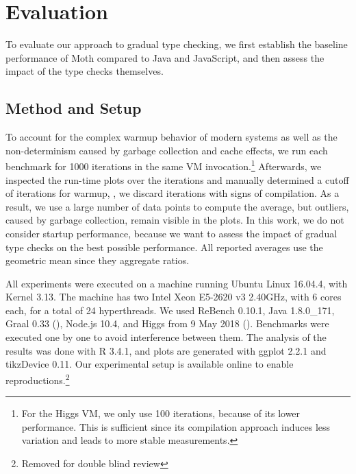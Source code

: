 
\section{Evaluation}
\label{sec:evaluation}

\newcommand{\NumIterationsAll}{1000\xspace}
\newcommand{\NumIterationsHiggs}{100\xspace}


To evaluate our approach to gradual type checking,
we first establish the baseline performance of Moth
compared to Java and JavaScript,
and then assess the impact of the type checks themselves.

\subsection{Method and Setup}

To account for the complex warmup behavior
of modern systems\citep{Barrett:2017:VMW} as well as
the non-determinism caused by \eg garbage collection and cache effects,
we run each benchmark for \NumIterationsAll iterations in the same
VM invocation.\footnote{
For the Higgs VM, we only use \NumIterationsHiggs iterations,
because of its lower performance.
This is sufficient since its compilation approach induces less variation
and leads to more stable measurements.}
Afterwards, we inspected the run-time plots over the iterations
and manually determined a cutoff of \WarmupCutOff iterations for warmup,
\ie, we discard iterations with signs of compilation.
As a result, we use a large number of data points to compute the average,
but outliers, caused by \eg garbage collection, remain visible in the plots.
In this work, we do not consider startup performance,
because we want to assess the impact of gradual type checks
on the best possible performance.
All reported averages use the geometric mean since they aggregate ratios.

All experiments were executed on a machine running Ubuntu Linux 16.04.4,
with Kernel 3.13.
The machine has two Intel Xeon E5-2620 v3 2.40GHz,
with 6 cores each, for a total of 24 hyperthreads.
We used ReBench 0.10.1\citep{ReBench:2018}, Java 1.8.0\_171, Graal 0.33 (),
Node.js 10.4, and Higgs from 9 May 2018 ().
Benchmarks were executed one by one to avoid interference between them.
The analysis of the results was done with R 3.4.1,
and plots are generated with ggplot 2.2.1 and tikzDevice 0.11.
Our experimental setup is available online to enable reproductions.\footnote{
Removed for double blind review
}


